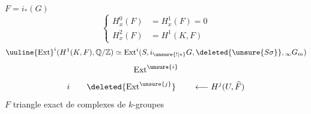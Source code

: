 $F=i_*(G)$
\[
\left\{\begin{aligned}
H^0_x(F)&=H^1_x(F)=0\\
H^2_x(F)&=H^1(K,F)
\end{aligned}\right.
\]
\[
\uuline{\operatorname{Ext}}^i(H^1(K,F),\mathbb Q/\mathbb Z)\simeq
\operatorname{Ext}^i(S,i_{\unsure{!|*}}G,\deleted{\unsure{S\sigma}},{}_\infty G_m)
\]
\[
\operatorname{Ext}^{\unsure{i}}
\]
\[
i\qquad\deleted{\operatorname{Ext}^{\unsure{j}}}\qquad\longleftarrow H^j(U,\widehat F)
\]
$F$
triangle exact de complexes de $k$-groupes


